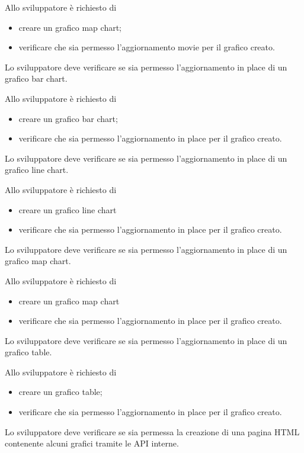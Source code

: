 		Allo sviluppatore è richiesto di
		\begin{itemize}
			\item creare un grafico map chart;
			\item verificare che sia permesso l'aggiornamento movie per il grafico creato.
		\end{itemize}

	Lo sviluppatore deve verificare se sia permesso l'aggiornamento in place di un grafico bar chart.
		
		Allo sviluppatore è richiesto di
		\begin{itemize}
			\item creare un grafico bar chart;
			\item verificare che sia permesso l'aggiornamento in place per il grafico creato.
		\end{itemize}

	Lo sviluppatore deve verificare se sia permesso l'aggiornamento in place di un grafico line chart.
		
		Allo sviluppatore è richiesto di
		\begin{itemize}
			\item creare un grafico line chart
			\item verificare che sia permesso l'aggiornamento in place per il grafico creato.
		\end{itemize}

	Lo sviluppatore deve verificare se sia permesso l'aggiornamento in place di un grafico map chart.
		
		Allo sviluppatore è richiesto di
		\begin{itemize}
			\item creare un grafico map chart
			\item verificare che sia permesso l'aggiornamento in place per il grafico creato.
		\end{itemize}

	Lo sviluppatore deve verificare se sia permesso l'aggiornamento in place di un grafico table.
		
		Allo sviluppatore è richiesto di
		\begin{itemize}
			\item creare un grafico table;
			\item verificare che sia permesso l'aggiornamento in place per il grafico creato.
		\end{itemize}

	Lo sviluppatore deve verificare se sia permessa la creazione di una pagina HTML contenente alcuni grafici tramite le API interne.
		
